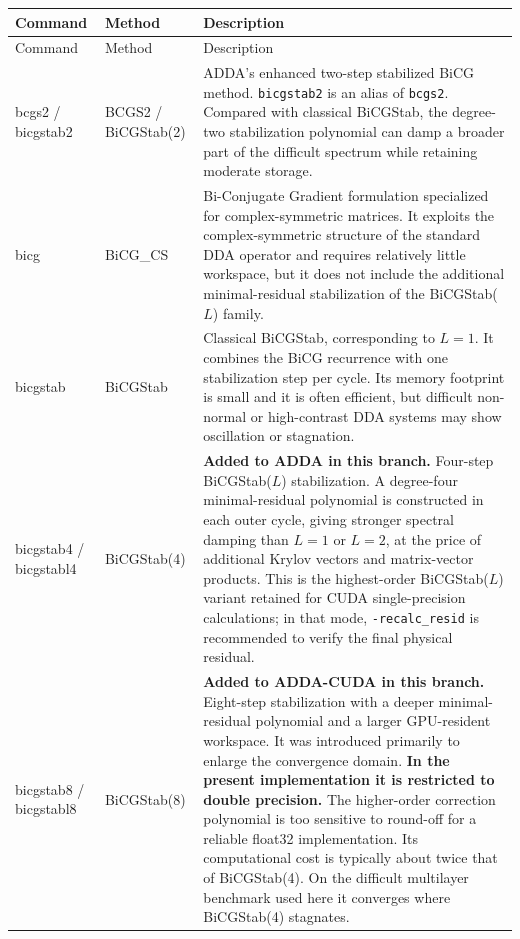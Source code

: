 \documentclass[11pt,a4paper]{article}
\begin{document}
\begin{longtable}{>{\ttfamily}p{3.15cm} p{3.25cm} p{8.45cm}}
\toprule
\textnormal{Command} & \textnormal{Method} & \textnormal{Description} \\
\midrule
\endfirsthead
\toprule
\textnormal{Command} & \textnormal{Method} & \textnormal{Description} \\
\midrule
\endhead
bcgs2 / bicgstab2 &
BCGS2 / BiCGStab(2) &
ADDA's enhanced two-step stabilized BiCG method. \texttt{bicgstab2} is an alias of \texttt{bcgs2}. Compared with classical BiCGStab, the degree-two stabilization polynomial can damp a broader part of the difficult spectrum while retaining moderate storage. \\

bicg &
BiCG\_CS &
Bi-Conjugate Gradient formulation specialized for complex-symmetric matrices. It exploits the complex-symmetric structure of the standard DDA operator and requires relatively little workspace, but it does not include the additional minimal-residual stabilization of the BiCGStab(\(L\)) family. \\

bicgstab &
BiCGStab &
Classical BiCGStab, corresponding to \(L=1\). It combines the BiCG recurrence with one stabilization step per cycle. Its memory footprint is small and it is often efficient, but difficult non-normal or high-contrast DDA systems may show oscillation or stagnation. \\

bicgstab4 / bicgstabl4 &
BiCGStab(4) &
\textbf{Added to ADDA in this branch.} Four-step BiCGStab(\(L\)) stabilization. A degree-four minimal-residual polynomial is constructed in each outer cycle, giving stronger spectral damping than \(L=1\) or \(L=2\), at the price of additional Krylov vectors and matrix-vector products. This is the highest-order BiCGStab(\(L\)) variant retained for CUDA single-precision calculations; in that mode, \texttt{-recalc\_resid} is recommended to verify the final physical residual. \\

bicgstab8 / bicgstabl8 &
BiCGStab(8) &
\textbf{Added to ADDA-CUDA in this branch.} Eight-step stabilization with a deeper minimal-residual polynomial and a larger GPU-resident workspace. It was introduced primarily to enlarge the convergence domain. \textbf{In the present implementation it is restricted to double precision.} The higher-order correction polynomial is too sensitive to round-off for a reliable float32 implementation. Its computational cost is typically about twice that of BiCGStab(4). On the difficult multilayer benchmark used here it converges where BiCGStab(4) stagnates. \\


\end{longtable}
\end{document}
